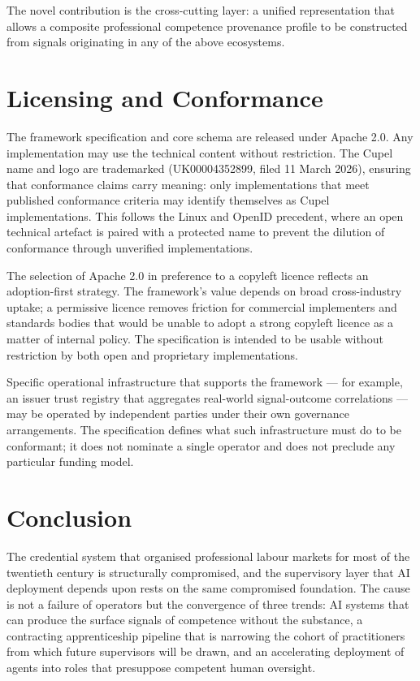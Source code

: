 \documentclass[11pt,a4paper]{article}
\begin{document}
The novel contribution is the cross-cutting layer: a unified representation that allows a
composite professional competence provenance profile to be constructed from signals originating
in any of the above ecosystems.

\section{Licensing and Conformance}

The framework specification and core schema are released under Apache 2.0. Any implementation
may use the technical content without restriction. The Cupel name and logo are trademarked
(UK00004352899, filed 11 March 2026), ensuring that conformance claims carry meaning: only
implementations that meet published conformance criteria may identify themselves as Cupel
implementations. This follows the Linux and OpenID precedent, where an open technical artefact
is paired with a protected name to prevent the dilution of conformance through unverified
implementations.

The selection of Apache 2.0 in preference to a copyleft licence reflects an adoption-first
strategy. The framework's value depends on broad cross-industry uptake; a permissive licence
removes friction for commercial implementers and standards bodies that would be unable to adopt
a strong copyleft licence as a matter of internal policy. The specification is intended to be
usable without restriction by both open and proprietary implementations.

Specific operational infrastructure that supports the framework — for example, an issuer trust
registry that aggregates real-world signal-outcome correlations — may be operated by independent
parties under their own governance arrangements. The specification defines what such
infrastructure must do to be conformant; it does not nominate a single operator and does not
preclude any particular funding model.

\section{Conclusion}

The credential system that organised professional labour markets for most of the twentieth century
is structurally compromised, and the supervisory layer that AI deployment depends upon rests on
the same compromised foundation. The cause is not a failure of operators but the convergence of
three trends: AI systems that can produce the surface signals of competence without the
substance, a contracting apprenticeship pipeline that is narrowing the cohort of practitioners
from which future supervisors will be drawn, and an accelerating deployment of agents into roles
that presuppose competent human oversight.
\end{document}
